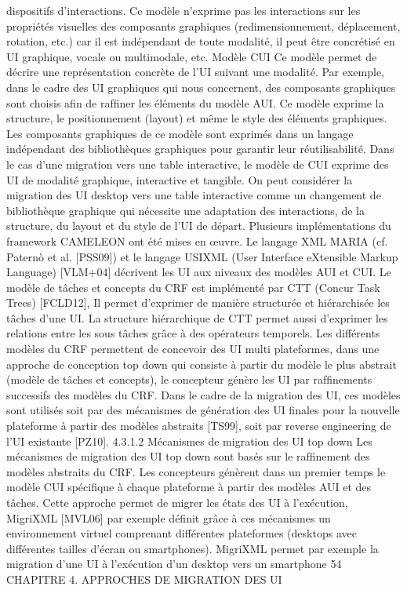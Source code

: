 \documentclass{article}
\begin{document}
dispositifs d’interactions. Ce mod\`{e}le n’exprime pas les interactions sur les propri\'{e}t\'{e}s visuelles des
composants graphiques (redimensionnement, d\'{e}placement, rotation, etc.) car il est ind\'{e}pendant de
toute modalit\'{e}, il peut \^{e}tre concr\'{e}tis\'{e} en UI graphique, vocale ou multimodale, etc.
Mod\`{e}le CUI
Ce mod\`{e}le permet de d\'{e}crire une repr\'{e}sentation concr\`{e}te de l’UI suivant une modalit\'{e}.
Par exemple, dans le cadre des UI graphiques qui nous concernent, des composants graphiques sont
choisis aﬁn de rafﬁner les \'{e}l\'{e}ments du mod\`{e}le AUI. Ce mod\`{e}le exprime la structure, le positionnement
(layout) et m\^{e}me le style des \'{e}l\'{e}ments graphiques. Les composants graphiques de ce mod\`{e}le sont
exprim\'{e}s dans un langage ind\'{e}pendant des biblioth\`{e}ques graphiques pour garantir leur r\'{e}utilisabilit\'{e}.
Dans le cas d’une migration vers une table interactive, le mod\`{e}le de CUI exprime des UI de
modalit\'{e} graphique, interactive et tangible. On peut consid\'{e}rer la migration des UI desktop vers une
table interactive comme un changement de biblioth\`{e}que graphique qui n\'{e}cessite une adaptation des
interactions, de la structure, du layout et du style de l’UI de d\'{e}part.
Plusieurs impl\'{e}mentations du framework CAMELEON ont \'{e}t\'{e} mises en œuvre. Le langage XML
MARIA (cf. Paternò et al. [PSS09]) et le langage USIXML (User Interface eXtensible Markup Language) [VLM+04] d\'{e}crivent les UI aux niveaux des mod\`{e}les AUI et CUI. Le mod\`{e}le de t\^{a}ches et
concepts du CRF est impl\'{e}ment\'{e} par CTT (Concur Task Trees) [FCLD12], Il permet d’exprimer de
mani\`{e}re structur\'{e}e et hi\'{e}rarchis\'{e}e les t\^{a}ches d’une UI. La structure hi\'{e}rarchique de CTT permet aussi
d’exprimer les relations entre les sous t\^{a}ches gr\^{a}ce \`{a} des op\'{e}rateurs temporels.
Les diff\'{e}rents mod\`{e}les du CRF permettent de concevoir des UI multi plateformes, dans une approche de conception top down qui consiste \`{a} partir du mod\`{e}le le plus abstrait (mod\`{e}le de t\^{a}ches et
concepts), le concepteur g\'{e}n\`{e}re les UI par rafﬁnements successifs des mod\`{e}les du CRF. Dans le cadre
de la migration des UI, ces mod\`{e}les sont utilis\'{e}s soit par des m\'{e}canismes de g\'{e}n\'{e}ration des UI ﬁnales
pour la nouvelle plateforme \`{a} partir des mod\`{e}les abstraits [TS99], soit par reverse engineering de l’UI
existante [PZ10].
4.3.1.2
M\'{e}canismes de migration des UI top down
Les m\'{e}canismes de migration des UI top down sont bas\'{e}s sur le rafﬁnement des mod\`{e}les abstraits du CRF. Les concepteurs g\'{e}n\`{e}rent dans un premier temps le mod\`{e}le CUI sp\'{e}ciﬁque \`{a} chaque
plateforme \`{a} partir des mod\`{e}les AUI et des t\^{a}ches. Cette approche permet de migrer les \'{e}tats des UI
\`{a} l’ex\'{e}cution, MigriXML [MVL06] par exemple d\'{e}ﬁnit gr\^{a}ce \`{a} ces m\'{e}canismes un environnement
virtuel comprenant diff\'{e}rentes plateformes (desktops avec diff\'{e}rentes tailles d’\'{e}cran ou smartphones).
MigriXML permet par exemple la migration d’une UI \`{a} l’ex\'{e}cution d’un desktop vers un smartphone
54
CHAPITRE 4. APPROCHES DE MIGRATION DES UI
 
\end{document}
